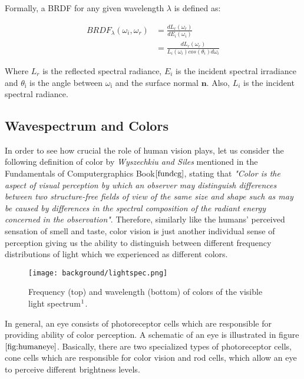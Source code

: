 Formally, a BRDF for any given wavelength $\lambda$ is defined as:

\begin{align}
  BRDF_{\lambda}(\omega_i, \omega_r)
  & = \frac{dL_r(\omega_r)}{dE_i(\omega_i)} \nonumber \\
  & = \frac{dL_r(\omega_r)}{L_i(\omega_i)cos(\theta_i)d\omega_i}
  \label{eq:defbrdf}
\end{align}

Where $L_{r}$ is the reflected spectral radiance, $E_i$ is the incident spectral irradiance and $\theta_{\text{i}}$ is the angle between $\omega_{\text{i}}$ and the surface normal $\mathbf n$. Also, $L_i$ is the incident spectral radiance.

\subsection{Wavespectrum and Colors}
In order to see how crucial the role of human vision plays, let us consider the following definition of color by \textit{Wyszechkiu and Siles} mentioned in the Fundamentals of Computergraphics Book$\cite{fundcg}$, stating that \textit{"Color is the aspect of visual perception by which an observer may distinguish differences between two structure-free fields of view of the same size and shape such as may be caused by differences in the spectral composition of the radiant energy concerned in the observation"}. Therefore, similarly like the humans' perceived sensation of smell and taste, color vision is just another individual sense of perception giving us the ability to distinguish between different frequency distributions of light which we experienced as different colors.

\begin{figure}[H]
  \centering
  \texttt{[image: background/lightspec.png]}
  \caption[Visible Lightspectrum]{Frequency (top) and wavelength (bottom) of colors of the visible light spectrum$\footnotemark$.}
  \label{fig:colorspectrum}
\end{figure}

In general, an eye consists of photoreceptor cells which are responsible for providing ability of color perception. A schematic of an eye is illustrated in figure $\ref{fig:humaneye}$. Basically, there are two specialized types of photoreceptor cells, cone cells which are responsible for color vision and rod cells, which allow an eye to perceive different brightness levels.

